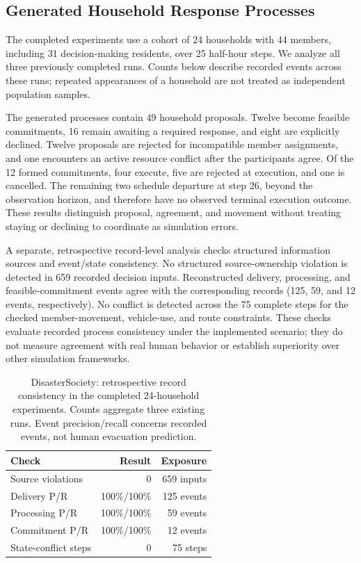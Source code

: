 \subsection{Generated Household Response Processes}
The completed experiments use a cohort of 24 households with 44 members,
including 31 decision-making residents, over 25 half-hour steps. We analyze
all three previously completed runs. Counts below describe recorded events
across these runs; repeated appearances of a household are not treated as
independent population samples.

The generated processes contain 49 household proposals. Twelve become
feasible commitments, 16 remain awaiting a required response, and eight are
explicitly declined. Twelve proposals are rejected for incompatible member
assignments, and one encounters an active resource conflict after the
participants agree. Of the 12 formed commitments, four execute, five are
rejected at execution, and one is cancelled. The remaining two schedule
departure at step 26, beyond the observation horizon, and therefore have no
observed terminal execution outcome. These results distinguish proposal,
agreement, and movement without treating staying or declining to coordinate
as simulation errors.

A separate, retrospective record-level analysis checks structured information
sources and event/state consistency. No structured source-ownership violation
is detected in 659 recorded decision inputs. Reconstructed delivery,
processing, and feasible-commitment events agree with the corresponding
records (125, 59, and 12 events, respectively). No conflict is detected across
the 75 complete steps for the checked member-movement, vehicle-use, and
route constraints. These checks evaluate recorded process consistency under
the implemented scenario; they do not measure agreement with real human
behavior or establish superiority over other simulation frameworks.

\begin{table}[t]
\centering
\footnotesize
\setlength{\tabcolsep}{4pt}
\caption{DisasterSociety: retrospective record consistency in the completed
24-household experiments. Counts aggregate three existing runs. Event
precision/recall concerns recorded events, not human evacuation prediction.}
\label{tab:ours-record-consistency-review}
\begin{tabular}{lrr}
\hline
Check & Result & Exposure \\
\hline
Source violations & 0 & 659 inputs \\
Delivery P/R & 100\%/100\% & 125 events \\
Processing P/R & 100\%/100\% & 59 events \\
Commitment P/R & 100\%/100\% & 12 events \\
State-conflict steps & 0 & 75 steps \\
\hline
\end{tabular}
\end{table}


